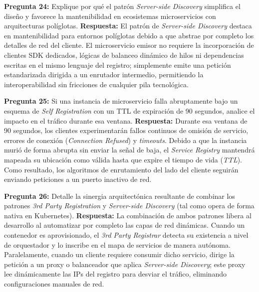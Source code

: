 \noindent\textbf{Pregunta 24:} Explique por qué el patrón \textit{Server-side Discovery} simplifica el diseño y favorece la mantenibilidad en ecosistemas microservicios con arquitecturas políglotas.
\newline
\textbf{Respuesta:} El patrón de \textit{Server-side Discovery} destaca en mantenibilidad para entornos políglotas debido a que abstrae por completo los detalles de red del cliente. El microservicio emisor no requiere la incorporación de clientes SDK dedicados, lógicas de balanceo dinámico de hilos ni dependencias escritas en el mismo lenguaje del registro; simplemente emite una petición estandarizada dirigida a un enrutador intermedio, permitiendo la interoperabilidad sin fricciones de cualquier pila tecnológica.

\vspace{4mm}

\noindent\textbf{Pregunta 25:} Si una instancia de microservicio falla abruptamente bajo un esquema de \textit{Self Registration} con un TTL de expiración de 90 segundos, analice el impacto en el tráfico durante esa ventana.
\newline
\textbf{Respuesta:} Durante esa ventana de 90 segundos, los clientes experimentarán fallos continuos de omisión de servicio, errores de conexión (\textit{Connection Refused}) y \textit{timeouts}. Debido a que la instancia murió de forma abrupta sin enviar la señal de baja, el \textit{Service Registry} mantendrá mapeada su ubicación como válida hasta que expire el tiempo de vida (\textit{TTL}). Como resultado, los algoritmos de enrutamiento del lado del cliente seguirán enviando peticiones a un puerto inactivo de red.

\vspace{4mm}

\noindent\textbf{Pregunta 26:} Detalle la sinergia arquitectónica resultante de combinar los patrones \textit{3rd Party Registration} y \textit{Server-side Discovery} (tal como opera de forma nativa en Kubernetes).
\newline
\textbf{Respuesta:} La combinación de ambos patrones libera al desarrollo al automatizar por completo las capas de red dinámicas. Cuando un contenedor es aprovisionado, el \textit{3rd Party Registrar} detecta su existencia a nivel de orquestador y lo inscribe en el mapa de servicios de manera autónoma. Paralelamente, cuando un cliente requiere consumir dicho servicio, dirige la petición a un proxy o balanceador que aplica \textit{Server-side Discovery}; este proxy lee dinámicamente las IPs del registro para desviar el tráfico, eliminando configuraciones manuales de red.

